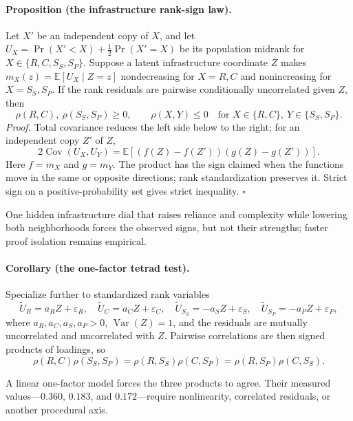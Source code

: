 \documentclass[11pt]{article}
\begin{document}
\paragraph{Proposition (the infrastructure rank-sign law).}
Let $X'$ be an independent copy of $X$, and let
$U_X=\Pr(X'<X)+\tfrac12\Pr(X'=X)$ be its population midrank for
$X\in\{R,C,S_S,S_P\}$.  Suppose a latent infrastructure coordinate $Z$ makes
$m_X(z)=\mathbb E[U_X\mid Z=z]$ nondecreasing for $X=R,C$ and nonincreasing for
$X=S_S,S_P$.  If the rank residuals are pairwise conditionally uncorrelated given $Z$, then
\[
 \rho(R,C),\ \rho(S_S,S_P)\geq0,
 \qquad \rho(X,Y)\leq0
 \quad\text{for }X\in\{R,C\},\ Y\in\{S_S,S_P\}.
\]
\emph{Proof.}
Total covariance reduces the left side below to the right; for an independent copy $Z'$ of $Z$,
\[
 2\operatorname{Cov}(U_X,U_Y)
 =\mathbb E[(f(Z)-f(Z'))(g(Z)-g(Z'))].
\]
Here $f=m_X$ and $g=m_Y$.  The product has the sign claimed when the functions move in the same
or opposite directions; rank standardization preserves it.  Strict sign on a positive-probability
set gives strict inequality. $\square$

\begin{intuitionbox}
One hidden infrastructure dial that raises reliance and complexity while lowering both neighborhoods
forces the observed signs, but not their strengths; faster proof isolation remains empirical.
\end{intuitionbox}

\paragraph{Corollary (the one-factor tetrad test).}
Specialize further to standardized rank variables
\[
 \widetilde U_R=a_RZ+\varepsilon_R,\quad
 \widetilde U_C=a_CZ+\varepsilon_C,\quad
 \widetilde U_{S_S}=-a_SZ+\varepsilon_S,\quad
 \widetilde U_{S_P}=-a_PZ+\varepsilon_P,
\]
where $a_R,a_C,a_S,a_P>0$, $\operatorname{Var}(Z)=1$, and the residuals are mutually uncorrelated
and uncorrelated with $Z$.  Pairwise correlations are then signed products of loadings, so
\[
 \rho(R,C)\rho(S_S,S_P)
 =\rho(R,S_S)\rho(C,S_P)
 =\rho(R,S_P)\rho(C,S_S).
\]
\begin{intuitionbox}
A linear one-factor model forces the three products to agree.  Their measured values---$0.360$,
$0.183$, and $0.172$---require nonlinearity, correlated residuals, or another procedural axis.
\end{intuitionbox}
\end{document}
